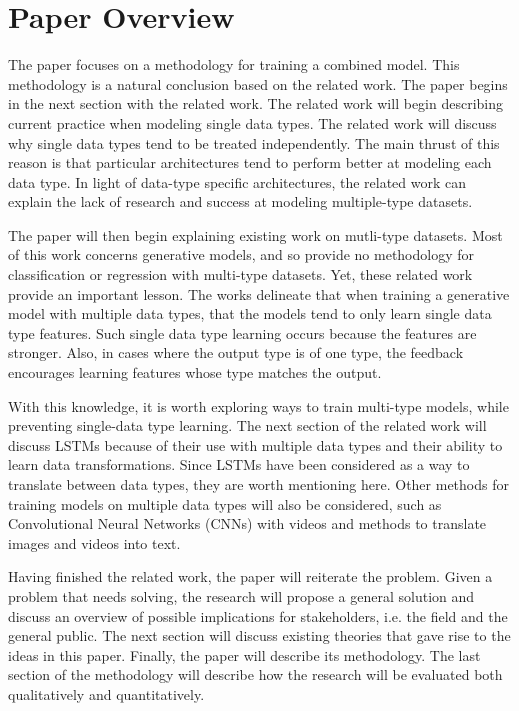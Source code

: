 \chapter{Paper Overview}
The paper focuses on a methodology for training a combined model.  This methodology is a natural conclusion based on the related work.  The paper begins in the next section with the related work.  The related work will begin describing current practice when modeling single data types.  The related work will discuss why single data types tend to be treated independently.  The main thrust of this reason is that particular architectures tend to perform better at modeling each data type.  In light of data-type specific architectures, the related work can explain the lack of research and success at modeling multiple-type datasets.

The paper will then begin explaining existing work on mutli-type datasets.  Most of this work concerns generative models, and so provide no methodology for classification or regression with multi-type datasets.  Yet, these related work provide an important lesson.  The works delineate that when training a generative model with multiple data types, that the models tend to only learn single data type features.  Such single data type learning occurs because the features are stronger.  Also, in cases where the output type is of one type, the feedback encourages learning features whose type matches the output.

With this knowledge, it is worth exploring ways to train multi-type models, while preventing single-data type learning.  The next section of the related work will discuss LSTMs because of their use with multiple data types and their ability to learn data transformations.  Since LSTMs have been considered as a way to translate between data types, they are worth mentioning here.  Other methods for training models on multiple data types will also be considered, such as Convolutional Neural Networks (CNNs) with videos and methods to translate images and videos into text.

Having finished the related work, the paper will reiterate the problem.  Given a problem that needs solving, the research will propose a general solution and discuss an overview of possible implications for stakeholders, i.e. the field and the general public.  The next section will discuss existing theories that gave rise to the ideas in this paper.  Finally, the paper will describe its methodology.  The last section of the methodology will describe how the research will be evaluated both qualitatively and quantitatively.  

